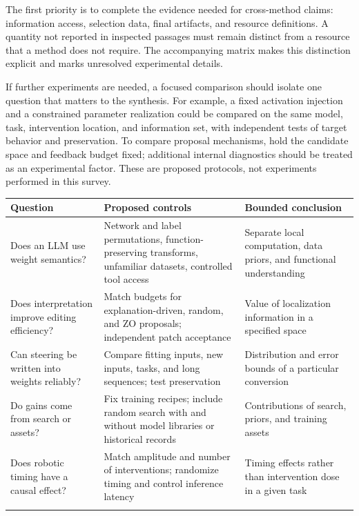 The first priority is to complete the evidence needed for cross-method claims: information access, selection data, final artifacts, and resource definitions. A quantity not reported in inspected passages must remain distinct from a resource that a method does not require. The accompanying matrix makes this distinction explicit and marks unresolved experimental details.


If further experiments are needed, a focused comparison should isolate one question that matters to the synthesis. For example, a fixed activation injection and a constrained parameter realization could be compared on the same model, task, intervention location, and information set, with independent tests of target behavior and preservation. To compare proposal mechanisms, hold the candidate space and feedback budget fixed; additional internal diagnostics should be treated as an experimental factor. These are proposed protocols, not experiments performed in this survey.


\begingroup\small\setlength{\tabcolsep}{5pt}\renewcommand{\arraystretch}{1.18}

\begin{longtable}{>{\raggedright\arraybackslash}p{4.85cm}>{\raggedright\arraybackslash}p{4.85cm}>{\raggedright\arraybackslash}p{4.85cm}}

\toprule

\textbf{Question} & \textbf{Proposed controls} & \textbf{Bounded conclusion}\\\midrule\endhead

Does an LLM use weight semantics? & Network and label permutations, function-preserving transforms, unfamiliar datasets, controlled tool access \cite{r22,r49} & Separate local computation, data priors, and functional understanding\\\addlinespace[3pt]

Does interpretation improve editing efficiency? & Match budgets for explanation-driven, random, and ZO proposals; independent patch acceptance \cite{r1,r52,r97} & Value of localization information in a specified space\\\addlinespace[3pt]

Can steering be written into weights reliably? & Compare fitting inputs, new inputs, tasks, and long sequences; test preservation \cite{r38,r120} & Distribution and error bounds of a particular conversion\\\addlinespace[3pt]

Do gains come from search or assets? & Fix training recipes; include random search with and without model libraries or historical records \cite{r140,r157,r173} & Contributions of search, priors, and training assets\\\addlinespace[3pt]

Does robotic timing have a causal effect? & Match amplitude and number of interventions; randomize timing and control inference latency \cite{r176,r198,r199,r200} & Timing effects rather than intervention dose in a given task\\\addlinespace[3pt]

\bottomrule\end{longtable}\endgroup

